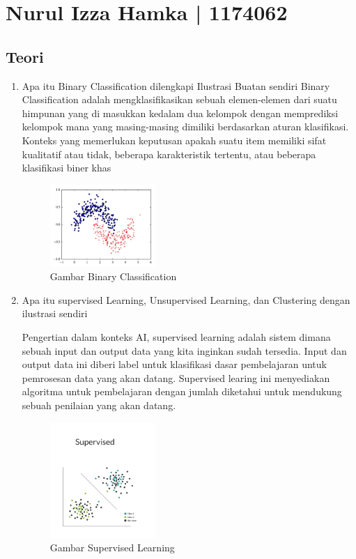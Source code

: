 \section{Nurul Izza Hamka | 1174062}
\subsection{Teori}
\begin{enumerate}

\item Apa itu Binary Classification dilengkapi Ilustrasi Buatan sendiri
Binary Classification adalah  mengklasifikasikan sebuah elemen-elemen dari suatu himpunan yang di masukkan kedalam dua kelompok dengan memprediksi  kelompok mana yang masing-masing dimiliki berdasarkan aturan klasifikasi. Konteks yang memerlukan keputusan apakah suatu item memiliki sifat kualitatif atau tidak, beberapa karakteristik tertentu, atau beberapa klasifikasi biner khas

\begin{figure}[H]
	\includegraphics[width=4cm]{figures/1174062/2/Teori/no1.png}
	\centering
	\caption{Gambar Binary Classification }
\end{figure}

\item Apa itu supervised Learning, Unsupervised Learning, dan Clustering dengan ilustrasi sendiri

Pengertian dalam konteks AI, supervised learning adalah sistem dimana sebuah input dan output data yang kita inginkan sudah tersedia. Input dan output data ini diberi label untuk klasifikasi dasar pembelajaran untuk pemrosesan data yang akan datang. Supervised learing ini menyediakan algoritma untuk pembelajaran dengan jumlah diketahui untuk mendukung sebuah penilaian yang akan datang.\\

\begin{figure}[H]
	\includegraphics[width=4cm]{figures/1174062/2/Teori/no2.png}
	\centering
	\caption{Gambar Supervised Learning }
\end{figure}


\end{enumerate}
